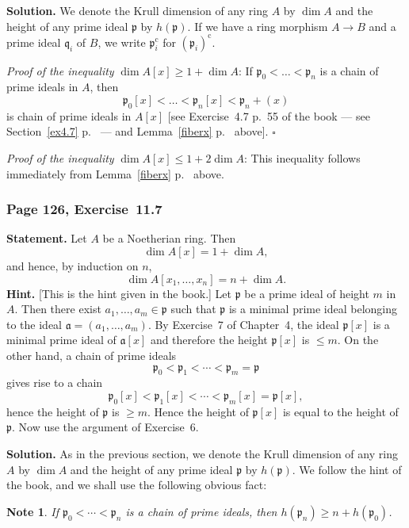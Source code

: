 \documentclass[12pt,letterpaper]{article}%
\newcommand{\oo}{\operatorname}\newcommand{\ooo}{\operatorname*}
\newcommand{\mf}{\mathfrak}
\newcommand{\aaa}{\mf a}
\newcommand{\ppp}{\mf p}
\newcommand{\qqq}{\mf q}
\newcommand{\nn}{\noindent}
\newtheorem{note}[thm]{Note}
\begin{document}
\nn\textbf{Solution.} We denote the Krull dimension of any ring $A$ by $\dim A$ and the height of any prime ideal $\ppp$ by $h(\ppp)$. If we have a ring morphism $A\to B$ and a prime ideal $\qqq_i$ of $B$, we write $\ppp_i^{\oo c}$ for $(\ppp_i)^{\oo c}$.  

\nn\emph{Proof of the inequality} $\dim A[x]\ge1+\dim A$: If 
$
\ppp_0<\dots<\ppp_n
$ 
is a chain of prime ideals in $A$, then 
$$
\ppp_0[x]<\dots<\ppp_n[x]<\ppp_n+(x)
$$ 
is chain of prime ideals in $A[x]$ [see Exercise~4.7 p.~55 of the book --- see Section~\ref{ex4.7} p.~\pageref{ex4.7} --- and Lemma~\ref{fiberx} p.~\pageref{fiberx} above]. $\square$ 

\nn\emph{Proof of the inequality} $\dim A[x]\le1+2\dim A$: This inequality follows immediately from Lemma~\ref{fiberx} p.~\pageref{fiberx} above.

\subsubsection{Page 126, Exercise~11.7}%

\textbf{Statement.} Let $A$ be a Noetherian ring. Then
\begin{equation}\label{dax}
\dim A[x]=1+\dim A,
\end{equation}
and hence, by induction on $n$,
$$
\dim A[x_1,\ldots,x_n]=n+\dim A.
$$ 
\nn\textbf{Hint.} [This is the hint given in the book.] Let $\ppp$ be a prime ideal of height $m$ in $A$. Then there exist $a_1,\ldots,a_m\in\ppp$ such that $\ppp$ is a minimal prime ideal belonging to the ideal $\aaa=(a_1,\ldots,a_m)$. By Exercise~7 of Chapter~4, the ideal $\ppp[x]$ is a minimal prime ideal of $\aaa[x]$ and therefore the height $\ppp[x]$ is $\le m$. On the other hand, a chain of prime ideals 
$$
\ppp_0<\ppp_1<\cdots<\ppp_m=\ppp
$$ 
gives rise to a chain 
$$
\ppp_0[x]<\ppp_1[x]<\cdots<\ppp_m[x]=\ppp[x],
$$ 
hence the height of $\ppp$ is $\ge m$. Hence the height of $\ppp[x]$ is equal to the height of $\ppp$. Now use the argument of Exercise~6. 

\nn\textbf{Solution.} As in the previous section, we denote the Krull dimension of any ring $A$ by $\dim A$ and the height of any prime ideal $\ppp$ by $h(\ppp)$. We follow the hint of the book, and we shall use the following obvious fact: 

\begin{note}\label{116a}
If $\ppp_0<\cdots<\ppp_n$ is a chain of prime ideals, then $h(\ppp_n)\ge n+h(\ppp_0)$. 
\end{note}%
\end{document}
